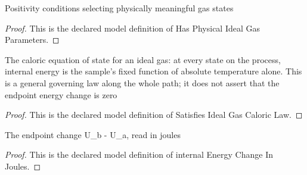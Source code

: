 \begin{definition}
  \label{def:physics:phyx-mini-0339:phyxminiproblems-problemphyxmini0339-hasphysicalidealgasparameters}
  Positivity conditions selecting physically meaningful gas states
\end{definition}
\begin{proof}
  This is the declared model definition of Has Physical Ideal Gas Parameters.
\end{proof}
\begin{definition}
  \label{def:physics:phyx-mini-0339:phyxminiproblems-problemphyxmini0339-satisfiesidealgascaloriclaw}
  The caloric equation of state for an ideal gas: at every state on the process, internal energy is the sample's fixed function of absolute temperature alone. This is a general governing law along the whole path; it does not assert that the endpoint energy change is zero
\end{definition}
\begin{proof}
  This is the declared model definition of Satisfies Ideal Gas Caloric Law.
\end{proof}
\begin{definition}
  \label{def:physics:phyx-mini-0339:phyxminiproblems-problemphyxmini0339-internalenergychangeinjoules}
  The endpoint change U\_b - U\_a, read in joules
\end{definition}
\begin{proof}
  This is the declared model definition of internal Energy Change In Joules.
\end{proof}
